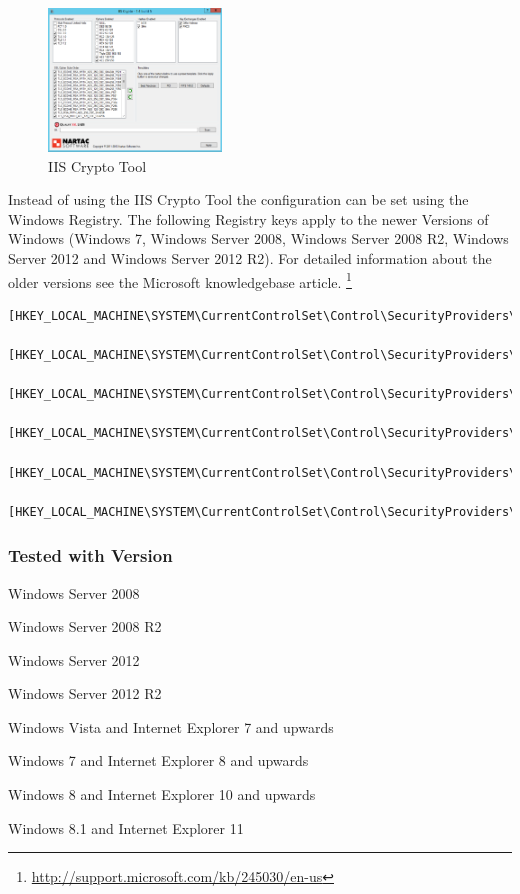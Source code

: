 \begin{figure}[p]
  \centering
  \includegraphics[width=0.411\textwidth]{img/IISCryptoConfig.png}
  \caption{IIS Crypto Tool}
  \label{fig:IISCryptoConfig}
\end{figure}

Instead of using the IIS Crypto Tool the configuration can be set
using the Windows Registry. The following Registry keys apply to the
newer Versions of Windows (Windows 7, Windows Server 2008, Windows
Server 2008 R2, Windows Server 2012 and Windows Server 2012 R2). For detailed
information about the older versions see the Microsoft knowledgebase
article. \footnote{\url{http://support.microsoft.com/kb/245030/en-us}}
\begin{lstlisting}[breaklines]
  [HKEY_LOCAL_MACHINE\SYSTEM\CurrentControlSet\Control\SecurityProviders\Schannel] 
  [HKEY_LOCAL_MACHINE\SYSTEM\CurrentControlSet\Control\SecurityProviders\Schannel\Ciphers] 
  [HKEY_LOCAL_MACHINE\SYSTEM\CurrentControlSet\Control\SecurityProviders\Schannel\CipherSuites] 
  [HKEY_LOCAL_MACHINE\SYSTEM\CurrentControlSet\Control\SecurityProviders\Schannel\Hashes] 
  [HKEY_LOCAL_MACHINE\SYSTEM\CurrentControlSet\Control\SecurityProviders\Schannel\KeyExchangeAlgorithms] 
  [HKEY_LOCAL_MACHINE\SYSTEM\CurrentControlSet\Control\SecurityProviders\Schannel\Protocols] 
\end{lstlisting}

\subsubsection{Tested with Version} 
\begin{itemize*}
  \item Windows Server 2008
  \item Windows Server 2008 R2
  \item Windows Server 2012
  \item Windows Server 2012 R2
\end{itemize*}

\begin{itemize*}
  \item Windows Vista and Internet Explorer 7 and upwards
  \item Windows 7 and Internet Explorer 8 and upwards
  \item Windows 8 and Internet Explorer 10 and upwards
  \item Windows 8.1 and Internet Explorer 11
\end{itemize*}






